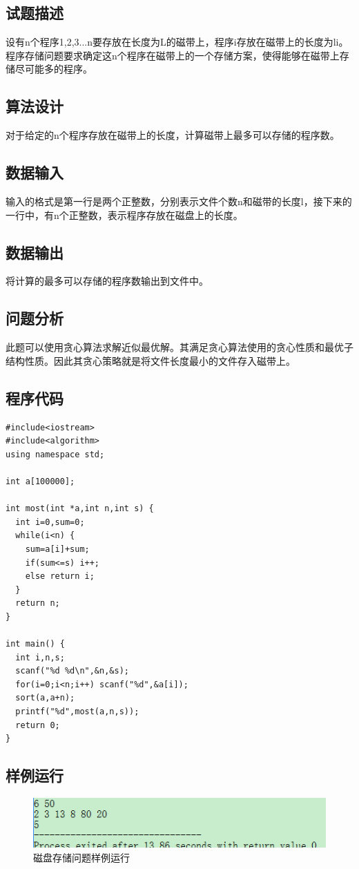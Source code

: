 \documentclass[UTF8]{ctexart}
\begin{document}
    \subsection{试题描述}
    设有n个程序{1,2,3...n}要存放在长度为L的磁带上，程序i存放在磁带上的长度为li。程序存储问题要求确定这n个程序在磁带上的一个存储方案，使得能够在磁带上存储尽可能多的程序。
    \subsection{算法设计}
    对于给定的n个程序存放在磁带上的长度，计算磁带上最多可以存储的程序数。
    \subsection{数据输入}
    输入的格式是第一行是两个正整数，分别表示文件个数n和磁带的长度l，接下来的一行中，有n个正整数，表示程序存放在磁盘上的长度。
    \subsection{数据输出}
    将计算的最多可以存储的程序数输出到文件中。
    \subsection{问题分析}
    此题可以使用贪心算法求解近似最优解。其满足贪心算法使用的贪心性质和最优子结构性质。因此其贪心策略就是将文件长度最小的文件存入磁带上。
    \subsection{程序代码}
    \begin{small}
    \begin{lstlisting}
#include<iostream>
#include<algorithm>
using namespace std;

int a[100000];

int most(int *a,int n,int s) {
  int i=0,sum=0;
  while(i<n) {
    sum=a[i]+sum;
    if(sum<=s) i++;
    else return i;
  }
  return n;
}

int main() {
  int i,n,s;
  scanf("%d %d\n",&n,&s);
  for(i=0;i<n;i++) scanf("%d",&a[i]);
  sort(a,a+n);
  printf("%d",most(a,n,s));
  return 0;
}
    \end{lstlisting}
    \end{small}
    \subsection{样例运行}
    \begin{figure}[!htb]
      \centering
      \includegraphics[width=1.0\textwidth]{../img/4.5.PNG}
      \caption{磁盘存储问题样例运行}\label{磁盘存储问题样例运行}
    \end{figure}
\end{document}
